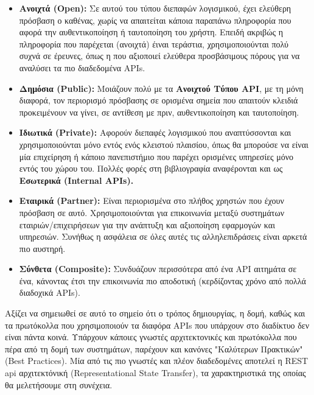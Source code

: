 \begin{itemize}
	\item \textbf{Ανοιχτά (Open):} Σε αυτού του τύπου διεπαφών λογισμικού, έχει ελεύθερη πρόσβαση ο καθένας,
		χωρίς να απαιτείται κάποια παραπάνω πληροφορία που αφορά την αυθεντικοποίηση ή ταυτοποίηση του χρήστη.
		Επειδή ακριβώς η πληροφορία που παρέχεται (ανοιχτά) έιναι τεράστια, χρησιμοποιούνται πολύ
		συχνά σε έρευνες, όπως η \cite{open_restful_api_analysis} που αξιοποιεί ελεύθερα προσβάσιμους
		πόρους για να αναλύσει τα πιο διαδεδομένα APIs. 
	\item \textbf{Δημόσια (Public):} Μοιάζουν πολύ με τα \textbf{Ανοιχτού Τύπου API}, με τη μόνη διαφορά, τον περιορισμό
		πρόσβασης σε ορισμένα σημεία που απαιτούν κλειδιά προκειμένουν να γίνει, σε αντίθεση με πριν, αυθεντικοποίηση και ταυτοποίηση. 
	\item \textbf{Ιδιωτικά (Private):} Αφορούν διεπαφές λογισμικού που αναπτύσσονται και χρησιμοποιούνται μόνο εντός ενός κλειστού
		πλαισίου, όπως θα μπορούσε να είναι μία επιχείρηση ή κάποιο πανεπιστήμιο που παρέχει ορισμένες υπηρεσίες μόνο εντός του χώρου του.
		Πολλές φορές στη βιβλιογραφία αναφέρονται και ως \textbf{Εσωτερικά (Internal APIs).}
	\item \textbf{Εταιρικά (Partner):} Είναι περιορισμένα στο πλήθος χρηστών που έχουν πρόσβαση σε αυτό. Χρησιμοποιούνται
		για επικοινωνία μεταξύ συστημάτων εταιριών/επιχειρήσεων για την ανάπτυξη και αξιοποίηση εφαρμογών και υπηρεσιών.
		Συνήθως η ασφάλεια σε όλες αυτές τις αλληλεπιδράσεις είναι αρκετά πιο αυστηρή.
	\item \textbf{Σύνθετα (Composite):} Συνδυάζουν περισσότερα από ένα API αιτημάτα σε ένα, κάνοντας έτσι 
		την επικοινωνία πιο αποδοτική (κερδίζοντας χρόνο από πολλά διαδοχικά APIs).
\end{itemize}

Αξίζει να σημειωθεί σε αυτό το σημείο ότι ο τρόπος δημιουργίας, η δομή, καθώς και τα πρωτόκολλα που χρησιμοποιούν τα διαφόρα APIs που υπάρχουν στο διαδίκτυο
δεν είναι πάντα κοινά. Υπάρχουν κάποιες γνωστές αρχιτεκτονικές και πρωτόκολλα που πέρα από τη δομή των συστημάτων, παρέχουν και κανόνες "Καλύτερων Πρακτικών" (Best Practices). Μία από τις πιο γνωστές και πλέον διαδεδομένες αποτελεί η REST api αρχιτεκτόνική (Representational State Transfer), τα χαρακτηριστικά της οποίας θα μελετήσουμε στη συνέχεια. 

